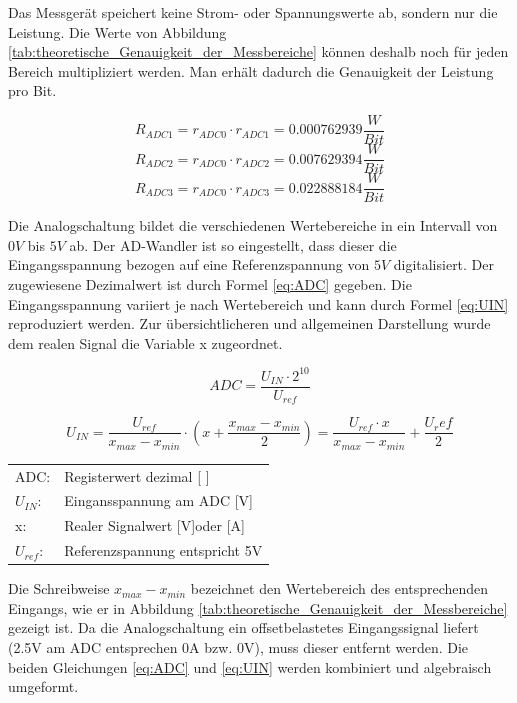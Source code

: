 Das Messgerät speichert keine Strom- oder Spannungswerte ab, sondern nur die Leistung. Die Werte von Abbildung \ref{tab:theoretische_Genauigkeit_der_Messbereiche} können deshalb noch für jeden Bereich multipliziert werden. Man erhält dadurch die Genauigkeit der Leistung pro Bit.

\begin{equation}
R_{ADC1}=r_{ADC0}\cdot r_{ADC1}= 0.000762939\frac{W}{Bit}
\label{eq:RADC1}
\end{equation}
\begin{equation}
R_{ADC2}=r_{ADC0}\cdot r_{ADC2}= 0.007629394\frac{W}{Bit}
\label{eq:RADC2}
\end{equation}
\begin{equation}
R_{ADC3}=r_{ADC0}\cdot r_{ADC3}= 0.022888184\frac{W}{Bit}
\label{eq:RADC3}
\end{equation}

Die Analogschaltung bildet die verschiedenen Wertebereiche in ein Intervall von $0V$ bis $5V$ ab. Der AD-Wandler ist so eingestellt, dass dieser die Eingangsspannung bezogen auf eine Referenzspannung von $5V$ digitalisiert. Der zugewiesene Dezimalwert ist durch Formel \ref{eq:ADC} gegeben. Die Eingangsspannung variiert je nach Wertebereich und kann durch Formel \ref{eq:UIN} reproduziert werden. Zur übersichtlicheren und allgemeinen Darstellung wurde dem realen Signal die Variable x zugeordnet.

\begin{equation}
ADC=\frac{U_{IN} \cdot 2^{10}}{U_{ref}}
\label{eq:ADC}
\end{equation}

\begin{equation}
U_{IN} =\frac{U_{ref}}{x_{max} - x_{min}} \cdot \left( x + \frac{x_{max} - x_{min}}{2} \right) = \frac{U_{ref} \cdot x}{x_{max} - x_{min}}+\frac{U_ref}{2}
\label{eq:UIN}
\end{equation}

\begin{table}[H]
\begin{tabular}{ll}
ADC:		&  Registerwert dezimal [ ]\\
$U_{IN}$:	&  Eingansspannung am ADC [V]\\
x:			&  Realer Signalwert [V]oder [A]\\
$U_{ref}$:	&  Referenzspannung entspricht 5V\\
\end{tabular}
\end{table}

Die Schreibweise $x_{max}-x_{min}$ bezeichnet den Wertebereich des entsprechenden Eingangs, wie er in Abbildung \ref{tab:theoretische_Genauigkeit_der_Messbereiche} gezeigt ist. Da die Analogschaltung ein offsetbelastetes Eingangssignal liefert (2.5V am ADC entsprechen 0A bzw. 0V), muss dieser entfernt werden. Die beiden Gleichungen \ref{eq:ADC} und \ref{eq:UIN} werden kombiniert und algebraisch umgeformt.

